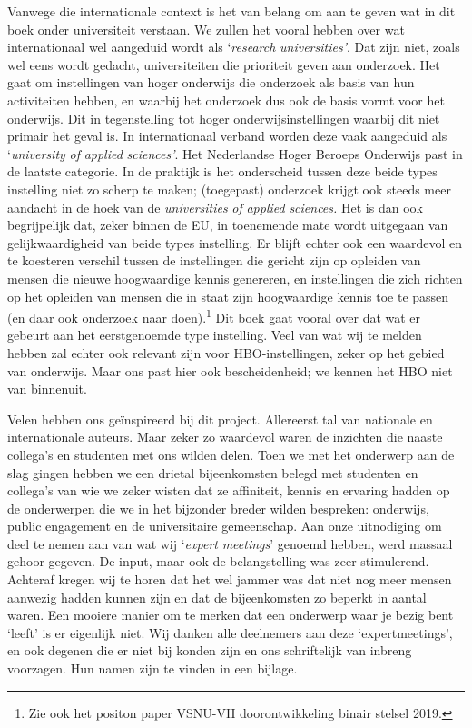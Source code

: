 \documentclass[smallauthor, chapterhaspagenum, nochapterinheader, pagenuminheader,  bigchapnum,medium2, tocpages,  garamond, titleinheader]{jote-book}
\begin{document}
	Vanwege die internationale context is het van belang om aan te geven wat in dit boek onder universiteit verstaan. We zullen het vooral hebben over wat internationaal wel aangeduid wordt als ‘\emph{research }\emph{universities}\emph{'}. Dat zijn niet, zoals wel eens wordt gedacht, universiteiten die prioriteit geven aan onderzoek. Het gaat om instellingen van hoger onderwijs die onderzoek als basis van hun activiteiten hebben, en waarbij het onderzoek dus ook de basis vormt voor het onderwijs. Dit in tegenstelling tot hoger onderwijsinstellingen waarbij dit niet primair het geval is. In internationaal verband worden deze vaak aangeduid als ‘\emph{university}\emph{ of }\emph{applied}\emph{ }\emph{sciences}\emph{'}. Het Nederlandse Hoger Beroeps Onderwijs past in de laatste categorie. In de praktijk is het onderscheid tussen deze beide types instelling niet zo scherp te maken; (toegepast) onderzoek krijgt ook steeds meer aandacht in de hoek van de \emph{universities}\emph{ of }\emph{applied}\emph{ }\emph{sciences}\emph{.} Het is dan ook begrijpelijk dat, zeker binnen de EU, in toenemende mate wordt uitgegaan van gelijkwaardigheid van beide types instelling. Er blijft echter ook een waardevol en te koesteren verschil tussen de instellingen die gericht zijn op opleiden van mensen die nieuwe hoogwaardige kennis genereren, en instellingen die zich richten op het opleiden van mensen die in staat zijn hoogwaardige kennis toe te passen (en daar ook onderzoek naar doen).\footnote{Zie ook het positon paper VSNU-VH doorontwikkeling binair stelsel 2019.} Dit boek gaat vooral over dat wat er gebeurt aan het eerstgenoemde type instelling. Veel van wat wij te melden hebben zal echter ook relevant zijn voor HBO-instellingen, zeker op het gebied van onderwijs. Maar ons past hier ook bescheidenheid; we kennen het HBO niet van binnenuit.



	Velen hebben ons geïnspireerd bij dit project. Allereerst tal van nationale en internationale auteurs. Maar zeker zo waardevol waren de inzichten die naaste collega's en studenten met ons wilden delen. Toen we met het onderwerp aan de slag gingen hebben we een drietal bijeenkomsten belegd met studenten en collega's van wie we zeker wisten dat ze affiniteit, kennis en ervaring hadden op de onderwerpen die we in het bijzonder breder wilden bespreken: onderwijs, public engagement en de universitaire gemeenschap. Aan onze uitnodiging om deel te nemen aan van wat wij ‘\emph{expert}\emph{ }\emph{meetings}' genoemd hebben, werd massaal gehoor gegeven. De input, maar ook de belangstelling was zeer stimulerend. Achteraf kregen wij te horen dat het wel jammer was dat niet nog meer mensen aanwezig hadden kunnen zijn en dat de bijeenkomsten zo beperkt in aantal waren. Een mooiere manier om te merken dat een onderwerp waar je bezig bent ‘leeft' is er eigenlijk niet. Wij danken alle deelnemers aan deze ‘expertmeetings', en ook degenen die er niet bij konden zijn en ons schriftelijk van inbreng voorzagen. Hun namen zijn te vinden in een bijlage.
\end{document}
